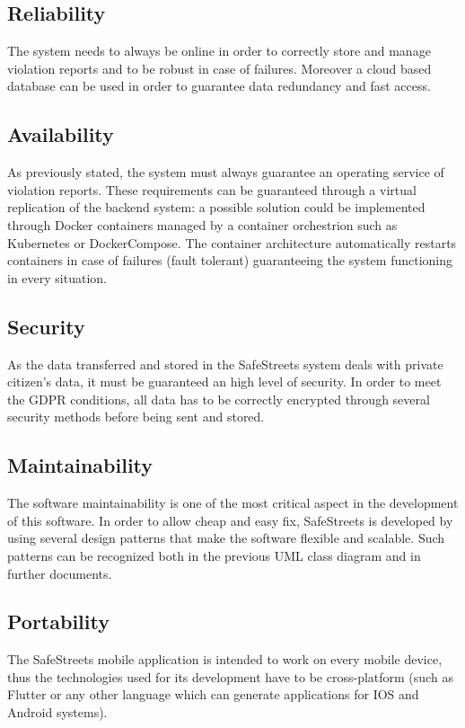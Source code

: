 \subsection{Reliability}
The system needs to always be online in order to correctly store and manage violation reports and to be robust in case of failures. Moreover a cloud based database can be used in order to guarantee data redundancy and fast access. 
\subsection{Availability}
As previously stated, the system must always guarantee an operating service of violation reports. These requirements can be guaranteed through a virtual replication of the backend system: a possible solution could be implemented through Docker containers managed by a container orchestrion such as Kubernetes or DockerCompose. The container architecture automatically restarts containers in case of failures (fault tolerant) guaranteeing the system functioning in every situation.

\subsection{Security}
As the data transferred and stored in the SafeStreets system deals with
private citizen's data, it must be guaranteed an high level of security.
In order to meet the GDPR conditions, all data has to be correctly 
encrypted through several security methods before being sent and stored.
\subsection{Maintainability}
The software maintainability is one of the most critical aspect in the
development of this software. In order to allow cheap and easy fix, SafeStreets
is developed by using several design patterns that make the software
flexible and scalable. Such patterns can be recognized both in the previous
UML class diagram and in further documents.
\subsection{Portability}
The SafeStreets mobile application is intended to work on every mobile device, thus the technologies used for its development have to be cross-platform (such as Flutter or any other language which can generate applications for IOS and Android systems).
